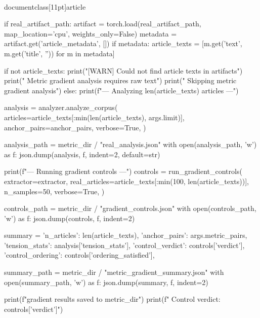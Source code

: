 \\documentclass[11pt]{article}
\begin{document}
\begin{CodeBlock}
            if real_artifact_path:
                artifact = torch.load(real_artifact_path, map_location='cpu', weights_only=False)
                metadata = artifact.get('article_metadata', [])
                if metadata:
                    article_texts = [m.get('text', m.get('title', '')) for m in metadata]
            
            if not article_texts:
                print("[WARN] Could not find article texts in artifacts")
                print("  Metric gradient analysis requires raw text")
                print("  Skipping metric gradient analysis")
            else:
                print(f"\n--- Analyzing {len(article_texts)} articles ---")
                
                analysis = analyzer.analyze_corpus(
                    articles=article_texts[:min(len(article_texts), args.limit)],
                    anchor_pairs=anchor_pairs,
                    verbose=True,
                )
                
                analysis_path = metric_dir / "real_analysis.json"
                with open(analysis_path, 'w') as f:
                    json.dump(analysis, f, indent=2, default=str)
                
                print(f"\n--- Running gradient controls ---")
                controls = run_gradient_controls(
                    extractor=extractor,
                    real_articles=article_texts[:min(100, len(article_texts))],
                    n_samples=50,
                    verbose=True,
                )
                
                controls_path = metric_dir / "gradient_controls.json"
                with open(controls_path, 'w') as f:
                    json.dump(controls, f, indent=2)
                
                summary = {
                    'n_articles': len(article_texts),
                    'anchor_pairs': args.metric_pairs,
                    'tension_stats': analysis['tension_stats'],
                    'control_verdict': controls['verdict'],
                    'control_ordering': controls['ordering_satisfied'],
                }
                
                summary_path = metric_dir / "metric_gradient_summary.json"
                with open(summary_path, 'w') as f:
                    json.dump(summary, f, indent=2)
                
                print(f"\nMetric gradient results saved to {metric_dir}")
                print(f"  Control verdict: {controls['verdict']}")
        

\end{CodeBlock}
\end{document}
